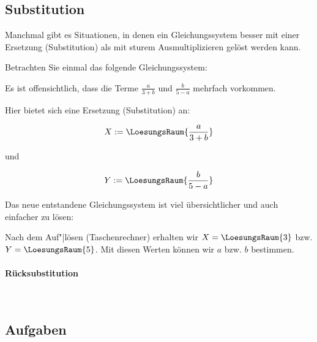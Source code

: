 \subsection{Substitution}
Manchmal gibt es Situationen, in denen ein Gleichungssystem besser mit
einer Ersetzung (Substitution) als mit sturem Ausmultiplizieren gelöst
werden kann.

Betrachten Sie einmal das folgende Gleichungssystem:


Es ist offensichtlich, dass die Terme $\frac{a}{3+b}$ und
$\frac{b}{5-a}$ mehrfach vorkommen.

Hier bietet sich eine Ersetzung (Substitution) an:

$$X := \LoesungsRaum{\frac{a}{3+b}}$$

und

$$Y := \LoesungsRaum{\frac{b}{5-a}}$$

Das neue entstandene Gleichungssystem ist viel übersichtlicher und
auch einfacher zu lösen:


Nach dem Auf"|lösen (\zB Taschenrechner) erhalten wir $X=\LoesungsRaum{3}$ bzw. $Y=\LoesungsRaum{5}$. Mit diesen Werten
können wir $a$ bzw. $b$ bestimmen.
\newpage

\paragraph{Rücksubstitution}\,\\

\vspace{1mm}



\subsection*{Aufgaben}
